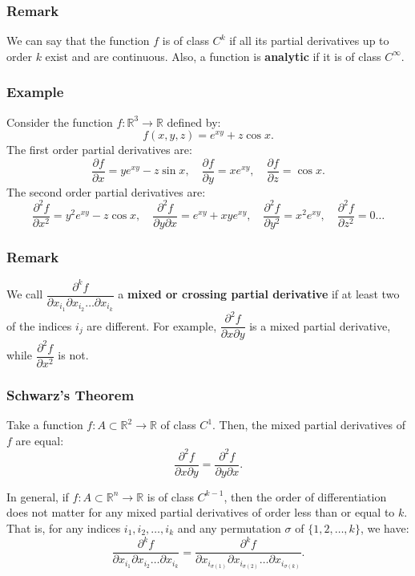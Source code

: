 \documentclass[11pt]{article}
\begin{document}
\subsubsection*{Remark}
We can say that the function \(f\) is of class \(C^k\) if all its partial derivatives up to order \(k\) exist and are continuous. Also, a function is \textbf{analytic} if it is of class \(C^\infty\).

\subsubsection*{Example}
Consider the function \(f : \mathbb{R}^3 \to \mathbb{R}\) defined by:
\[f(x, y, z) = e^{xy} + z \cos x.\]
The first order partial derivatives are:
\[\frac{\partial f}{\partial x} = y e^{xy} - z \sin x, \quad \frac{\partial f}{\partial y} = x e^{xy}, \quad \frac{\partial f}{\partial z} = \cos x.\]
The second order partial derivatives are:
\[\frac{\partial^2 f}{\partial x^2} = y^2 e^{xy} - z \cos x, \quad \frac{\partial^2 f}{\partial y \partial x} = e^{xy} + x y e^{xy}, \quad \frac{\partial^2 f}{\partial y^2} = x^2 e^{xy}, \quad \frac{\partial^2 f}{\partial z^2} = 0 \ldots\]

\subsubsection*{Remark}
We call \(\dfrac{\partial^k f}{\partial x_{i_1} \partial x_{i_2} \dots \partial x_{i_k}}\) a \textbf{mixed or crossing partial derivative} if at least two of the indices \(i_j\) are different. For example, \(\dfrac{\partial^2 f}{\partial x \partial y}\) is a mixed partial derivative, while \(\dfrac{\partial^2 f}{\partial x^2}\) is not.

\subsubsection{Schwarz's Theorem}
Take a function \(f : A \subset \mathbb{R}^2 \to \mathbb{R}\) of class \(C^1\). Then, the mixed partial derivatives of \(f\) are equal:
\[\frac{\partial^2 f}{\partial x \partial y} = \frac{\partial^2 f}{\partial y \partial x}.\]

\begin{remark}
    In general, if \(f : A \subset \mathbb{R}^n \to \mathbb{R}\) is of class \(C^{k-1}\), then the order of differentiation does not matter for any mixed partial derivatives of order less than or equal to \(k\). That is, for any indices \(i_1, i_2, \ldots, i_k\) and any permutation \(\sigma\) of \(\{1, 2, \ldots, k\}\), we have:
\[\frac{\partial^k f}{\partial x_{i_1} \partial x_{i_2} \dots \partial x_{i_k}} = \frac{\partial^k f}{\partial x_{i_{\sigma(1)}} \partial x_{i_{\sigma(2)}} \dots \partial x_{i_{\sigma(k)}}}.\]
\end{remark}
\end{document}
